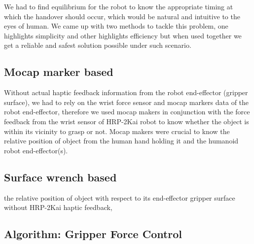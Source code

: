 We had to find equilibrium for the robot to know the appropriate timing at which the handover should occur, which would be natural and intuitive to the eyes of human. We came up with two methods to tackle this problem, one highlights simplicity and other highlights efficiency but when used together we get a reliable and safest solution possible under such scenario.


\subsection{Mocap marker based}
Without actual haptic feedback information from the robot end-effector (gripper surface), we had to rely on the wrist force sensor and mocap markers data of the robot end-effector, therefore we used mocap makers in conjunction with the force feedback from the wrist sensor of HRP-2Kai robot to know whether the object is within its vicinity to grasp or not. Mocap makers were crucial to know the relative position of object from the human hand holding it and the humanoid robot end-effector(s).




\subsection{Surface wrench based}
the relative position of object with respect to its end-effector gripper surface without HRP-2Kai haptic feedback,



\subsection{Algorithm: Gripper Force Control}

